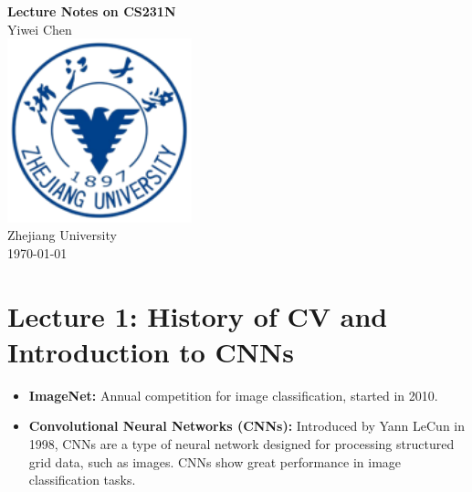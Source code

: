 \documentclass{article}
\begin{document}
\begin{CJK}{UTF8}{gbsn}
\begin{titlepage}
    \centering
    \vspace*{2cm}
    {\Huge \textbf{Lecture Notes on CS231N}}\\[1.5cm]
    {\Large Yiwei Chen}\\[0.5cm]
    \vfill
    \includegraphics[width=0.4\textwidth]{images/school_badge.png}\\[1cm] %
    {\large Zhejiang University}\\[1cm]
    {\large \today}
\end{titlepage}

\onehalfspacing %

\section*{Lecture 1: History of CV and Introduction to CNNs}
\begin{itemize}
    \item \textbf{ImageNet:} Annual competition for image classification, started in 2010.
    \item \textbf{Convolutional Neural Networks (CNNs):} Introduced by Yann LeCun in 1998, CNNs are a type of neural network designed for processing structured grid data, such as images. CNNs show great performance in image classification tasks.
\end{itemize}

\newpage


\end{CJK}
\end{document}
